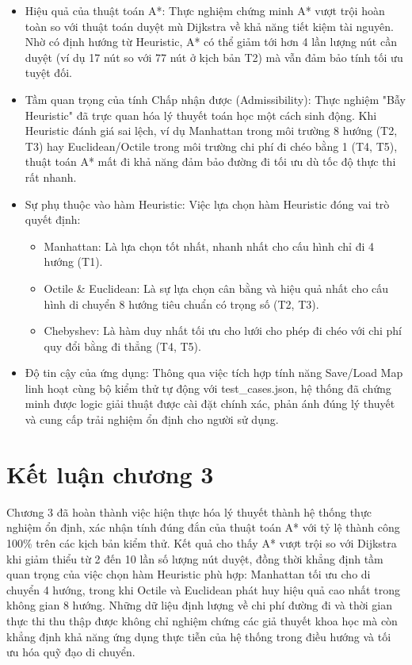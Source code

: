 \documentclass[12pt,a4paper]{report}
\begin{document}
\begin{itemize}
    \item Hiệu quả của thuật toán A*: Thực nghiệm chứng minh A* vượt trội hoàn toàn so với thuật toán duyệt mù Dijkstra về khả năng tiết kiệm tài nguyên. Nhờ có định hướng từ Heuristic, A* có thể giảm tới hơn 4 lần lượng nút cần duyệt (ví dụ 17 nút so với 77 nút ở kịch bản T2) mà vẫn đảm bảo tính tối ưu tuyệt đối.
    \item Tầm quan trọng của tính Chấp nhận được (Admissibility): Thực nghiệm "Bẫy Heuristic" đã trực quan hóa lý thuyết toán học một cách sinh động. Khi Heuristic đánh giá sai lệch, ví dụ Manhattan trong môi trường 8 hướng (T2, T3) hay Euclidean/Octile trong môi trường chi phí đi chéo bằng 1 (T4, T5), thuật toán A* mất đi khả năng đảm bảo đường đi tối ưu dù tốc độ thực thi rất nhanh.
    \item Sự phụ thuộc vào hàm Heuristic: Việc lựa chọn hàm Heuristic đóng vai trò quyết định:
    \begin{itemize}
        \item Manhattan: Là lựa chọn tốt nhất, nhanh nhất cho cấu hình chỉ đi 4 hướng (T1).
        \item Octile \& Euclidean: Là sự lựa chọn cân bằng và hiệu quả nhất cho cấu hình di chuyển 8 hướng tiêu chuẩn có trọng số (T2, T3).
        \item Chebyshev: Là hàm duy nhất tối ưu cho lưới cho phép đi chéo với chi phí quy đổi bằng đi thẳng (T4, T5).
    \end{itemize}
    \item Độ tin cậy của ứng dụng: Thông qua việc tích hợp tính năng Save/Load Map linh hoạt cùng bộ kiểm thử tự động với test\_cases.json, hệ thống đã chứng minh được logic giải thuật được cài đặt chính xác, phản ánh đúng lý thuyết và cung cấp trải nghiệm ổn định cho người sử dụng.
\end{itemize}

\section*{Kết luận chương 3}

Chương 3 đã hoàn thành việc hiện thực hóa lý thuyết thành hệ thống thực nghiệm ổn định, xác nhận tính đúng đắn của thuật toán A* với tỷ lệ thành công 100\% trên các kịch bản kiểm thử. Kết quả cho thấy A* vượt trội so với Dijkstra khi giảm thiểu từ 2 đến 10 lần số lượng nút duyệt, đồng thời khẳng định tầm quan trọng của việc chọn hàm Heuristic phù hợp: Manhattan tối ưu cho di chuyển 4 hướng, trong khi Octile và Euclidean phát huy hiệu quả cao nhất trong không gian 8 hướng. Những dữ liệu định lượng về chi phí đường đi và thời gian thực thi thu thập được không chỉ nghiệm chứng các giả thuyết khoa học mà còn khẳng định khả năng ứng dụng thực tiễn của hệ thống trong điều hướng và tối ưu hóa quỹ đạo di chuyển.
\end{document}
